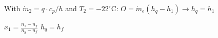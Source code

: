 With \( \dot{m}_2 = q \cdot c_{p} / h \) and \( T_2 = -22^\circ \text{C} \):  
\( O = \dot{m}_e (h_{q} - h_{1}) \rightarrow h_{q} = h_{1} \)  

\( x_1 = \frac{n_1 - n_f}{n_g - n_f} \)  
\( h_q = h_f \)